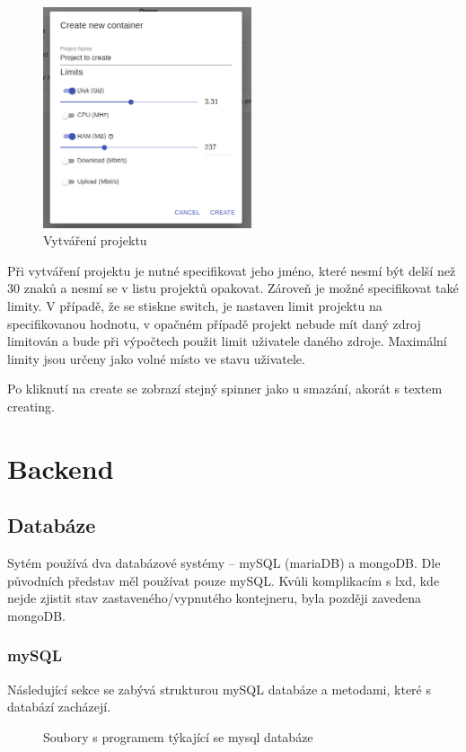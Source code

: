 \documentclass[a4paper,oneside,12pt]{report}
\begin{document}
\begin{figure}[h]
	\centering
	\includegraphics[height=6.5cm]{../img/createPro.png}
	\caption[Vytváření projekt, vlastní tvorba]{Vytváření projektu}
	\label{fig:createPro}
\end{figure}

Při vytváření projektu je nutné specifikovat jeho jméno, které nesmí být delší než 30 znaků a nesmí se v listu projektů opakovat. Zároveň je možné specifikovat také limity. V případě, že se stiskne switch, je nastaven limit projektu na specifikovanou hodnotu, v opačném případě projekt nebude mít daný zdroj limitován a bude při výpočtech použit limit uživatele daného zdroje. Maximální limity jsou určeny jako volné místo ve stavu uživatele.


Po kliknutí na create se zobrazí stejný spinner jako u smazání, akorát s textem creating.


\chapter{Backend}


\section{Databáze}

Sytém používá dva databázové systémy -- mySQL (mariaDB) a mongoDB.
Dle původních představ měl používat pouze mySQL.
Kvůli komplikacím s lxd, kde nejde zjistit stav zastaveného/vypnutého kontejneru, byla později zavedena mongoDB.

\subsection{mySQL}
Následující sekce se zabývá strukturou mySQL databáze a metodami, které s databází zacházejí.


\begin{figure}[h]
	\caption[Soubory s programem týkající se mysql databáze, vlastni tvorba]{Soubory s programem týkající se mysql databáze}
	\label{fig:sqlClasses}
\end{figure}
\end{document}
